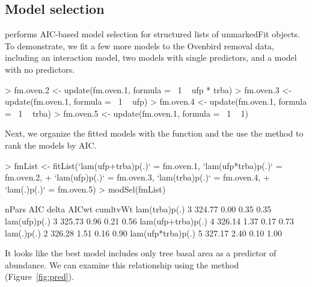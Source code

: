 \documentclass[article,shortnames]{jss}
\begin{document}
{\subsection{Model selection} 

 performs AIC-based model selection for structured lists of 
unmarkedFit objects.  To demonstrate, we fit a few more models to the Ovenbird
removal data, including an interaction model, two models with
single predictors, and a model with no predictors.

\begin{Schunk}
\begin{Sinput}
> fm.oven.2 <- update(fm.oven.1, formula = ~1 ~ ufp * trba)
> fm.oven.3 <- update(fm.oven.1, formula = ~1 ~ ufp)
> fm.oven.4 <- update(fm.oven.1, formula = ~1 ~ trba)
> fm.oven.5 <- update(fm.oven.1, formula = ~1 ~ 1)
\end{Sinput}
\end{Schunk}

Next, we organize the fitted models with the  function and
the use the  method to rank the models by AIC.

\begin{Schunk}
\begin{Sinput}
> fmList <- fitList(`lam(ufp+trba)p(.)` = fm.oven.1, `lam(ufp*trba)p(.)` = fm.oven.2, 
+     `lam(ufp)p(.)` = fm.oven.3, `lam(trba)p(.)` = fm.oven.4, 
+     `lam(.)p(.)` = fm.oven.5)
> modSel(fmList)
\end{Sinput}
\begin{Soutput}
                  nPars    AIC delta AICwt cumltvWt
lam(trba)p(.)         3 324.77  0.00  0.35     0.35
lam(ufp)p(.)          3 325.73  0.96  0.21     0.56
lam(ufp+trba)p(.)     4 326.14  1.37  0.17     0.73
lam(.)p(.)            2 326.28  1.51  0.16     0.90
lam(ufp*trba)p(.)     5 327.17  2.40  0.10     1.00
\end{Soutput}
\end{Schunk}

It looks like the best model includes only tree basal area as a
predictor of abundance.  We can examine this relationship using
the  method (Figure~\ref{fig:pred}).


}
\end{document}
